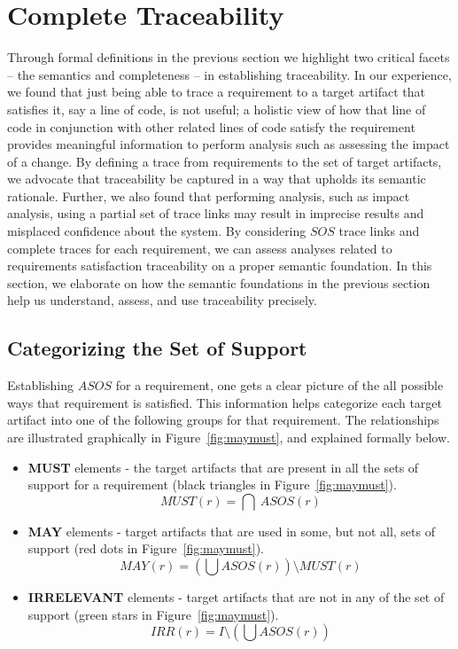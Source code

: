 \section{Complete Traceability}
\label{sec:discussion}

Through formal definitions in the previous section we highlight two critical facets -- the semantics and completeness -- in establishing traceability. In our experience, we found that just being able to trace a requirement to a target artifact that satisfies it, say a line of code, is not useful; a holistic view of how that line of code in conjunction with other related lines of code satisfy the requirement provides meaningful information to perform analysis such as assessing the impact of a change. By defining a trace from requirements to the set of target artifacts, we advocate that traceability be captured in a way that upholds its semantic rationale. Further, we also found that performing analysis, such as impact analysis, using a partial set of trace links may result in imprecise results and misplaced confidence about the system. By considering $SOS$ trace links and complete traces for each requirement, we can assess analyses related to requirements satisfaction traceability on a proper semantic foundation. In this section, we elaborate on how the semantic foundations in the previous section help us understand, assess, and use traceability precisely.


\subsection{Categorizing the Set of Support}

Establishing $ASOS$ for a requirement, one gets a clear picture of the all possible ways that requirement is satisfied. This information helps categorize each target artifact into one of the following groups for that requirement.  The relationships are illustrated graphically in Figure~\ref{fig:maymust}, and explained formally below.
\begin{itemize}
  \item \textbf{MUST} elements - the target artifacts that are present in all the sets of support for a requirement (black triangles in Figure~\ref{fig:maymust}).
      $$ MUST (r) = \bigcap \ ASOS(r) $$

  \item \textbf{MAY} elements - target artifacts that are used in some, but not all, sets of support (red dots in Figure~\ref{fig:maymust}).
      $$MAY(r) = (\bigcup ASOS (r)) \setminus MUST (r) $$

  \item \textbf{IRRELEVANT} elements - target artifacts that are not in any of the set of support (green stars in Figure~\ref{fig:maymust}). $$IRR(r) = I \setminus (\bigcup ASOS (r))$$
\end{itemize}


